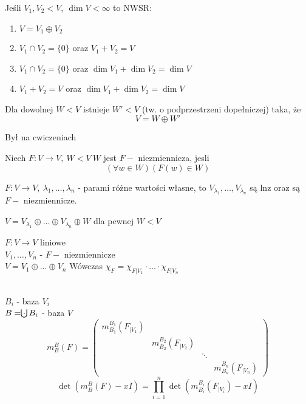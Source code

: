 \begin{wn} 
    Jeśli $V_1,V_2 < V, \ \dim V < \infty$ to NWSR:
    \begin{enumerate}[(1)]
        \item $V = V_1 \oplus V_2$
        \item $V_1 \cap V_2 = \{ 0\}$ oraz $V_1 + V_2 = V$
        \item $V_1 \cap V_2 = \{ 0\}$ oraz $\dim V_1 + \dim V_2 = \dim V$ 
        \item $V_1 + V_2 = V$ oraz $\dim V_1 + \dim V_2 = \dim V$
    \end{enumerate} 
\end{wn}
\begin{lem} 
    Dla dowolnej $W < V$ istnieje $W' < V$ (tw. o podprzestrzeni dopełniczej) taka, że \[V = W \oplus W'\]
    \begin{dd} Był na cwiczeniach \end{dd} 
\end{lem} 
\begin{df} 
    Niech $F: V \to V,\ W < V \ W$ jest $F-$ niezmiennicza, jesli \[ (\forall w \in W) (F(w) \in W)\]
\end{df}
\begin{ft} 
    $F: V \to V,\ \lambda_1,\ldots,\lambda_n$ - parami różne wartości własne, to $V_{\lambda_1},\ldots,
    V_{\lambda_n}$ są lnz oraz są $F-$ niezmiennicze.
\end{ft} 
\begin{wn} 
    $V = V_{\lambda_1} \oplus \ldots \oplus V_{\lambda_n} \oplus W$ dla pewnej $W < V$
\end{wn} 
\begin{ft} 
    $F: V \to V$ liniowe \\ 
    $V_1,\ldots,V_n$ - $F-$ niezmiennicze \\ 
    $V = V_1 \oplus \ldots \oplus V_n$ 
    Wówczas $\chi_F = \chi_{F|{V_1}} \cdot \ldots \cdot \chi_{F|V_n}$
\end{ft} 
\begin{dd} ~\\ 
    $B_i$ - baza $V_i$ \\ 
    $B = \cdot \hspace{-7.5pt}\bigcup B_i$ - baza $V$ %
    \[ m_B^B (F) = 
        \begin{pmatrix} 
            m_{B_1}^{B_1} (F_{|V_1}) & & &  \\ 
                                     &  m_{B_2}^{B_2} (F_{|V_2}) & & \\ 
                                     & & \ddots & \\ 
                                     & & &   m_{B_n}^{B_n} (F_{|V_n}) 
        \end{pmatrix} 
    \]
    \[ \det (m_B^B (F) - xI) = \prod_{i=1}^n \det (m_{B_i}^{B_i} (F_{|V_i}) -xI)\]
\end{dd} 

